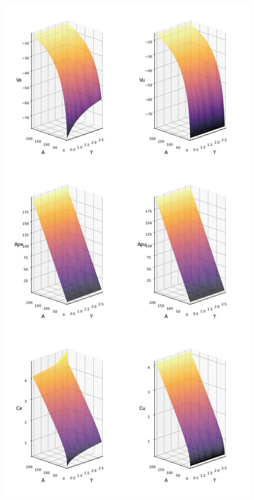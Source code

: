 \documentclass[12pt]{article}
\begin{document}
\includegraphics[height=\textheight]{problem sets/ps9/H-all_200.png}
\end{document}

